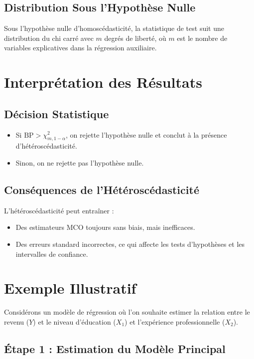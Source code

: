 \documentclass[14pt]{extarticle} %
\theoremstyle{definition}
\theoremstyle{plain}
\begin{document}
\subsection{Distribution Sous l'Hypothèse Nulle}

Sous l'hypothèse nulle d'homoscédasticité, la statistique de test suit une distribution du chi carré avec $m$ degrés de liberté, où $m$ est le nombre de variables explicatives dans la régression auxiliaire.

\section{Interprétation des Résultats}

\subsection{Décision Statistique}

\begin{itemize}
    \item Si $\text{BP} > \chi^2_{m, 1-\alpha}$, on rejette l'hypothèse nulle et conclut à la présence d'hétéroscédasticité.
    \item Sinon, on ne rejette pas l'hypothèse nulle.
\end{itemize}

\subsection{Conséquences de l'Hétéroscédasticité}

L'hétéroscédasticité peut entraîner :
\begin{itemize}
    \item Des estimateurs MCO toujours sans biais, mais inefficaces.
    \item Des erreurs standard incorrectes, ce qui affecte les tests d'hypothèses et les intervalles de confiance.
\end{itemize}

\section{Exemple Illustratif}

Considérons un modèle de régression où l'on souhaite estimer la relation entre le revenu ($Y$) et le niveau d'éducation ($X_1$) et l'expérience professionnelle ($X_2$).

\subsection{Étape 1 : Estimation du Modèle Principal}
\end{document}
